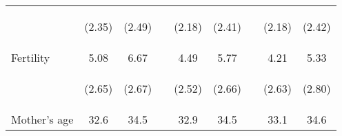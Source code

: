 \documentclass{article}[11pt,subeqn]
\begin{document}
\begin{spacing}{1.5}
\begin{table}[ht]
\begin{center}
\begin{tabular}{lccp{5mm}ccp{5mm}cc}
\begin{footnotesize}\end{footnotesize}	& \begin{footnotesize} (2.35)\end{footnotesize} & \begin{footnotesize} (2.49)\end{footnotesize} & \begin{footnotesize} 	\end{footnotesize} & \begin{footnotesize} (2.18)\end{footnotesize} & \begin{footnotesize} (2.41)\end{footnotesize} & \begin{footnotesize} 	\end{footnotesize} & \begin{footnotesize} (2.18)\end{footnotesize} & \begin{footnotesize} (2.42)\end{footnotesize}	\\
Fertility	&	5.08	&	6.67	&	&	4.49	&	5.77	&	&	4.21	&	5.33		\\
\begin{footnotesize}\end{footnotesize}	& \begin{footnotesize} (2.65)\end{footnotesize} & \begin{footnotesize} (2.67)\end{footnotesize} & \begin{footnotesize} 	\end{footnotesize} & \begin{footnotesize} (2.52)\end{footnotesize} & \begin{footnotesize} (2.66)\end{footnotesize} & \begin{footnotesize} 	\end{footnotesize} & \begin{footnotesize} (2.63)\end{footnotesize} & \begin{footnotesize} (2.80)\end{footnotesize}	\\
Mother's age	&	32.6	&	34.5	&	&	32.9	&	34.5	&	&	33.1	&	34.6		\\

\end{tabular}
\end{center}
\end{table}
\end{spacing}
\end{document}
